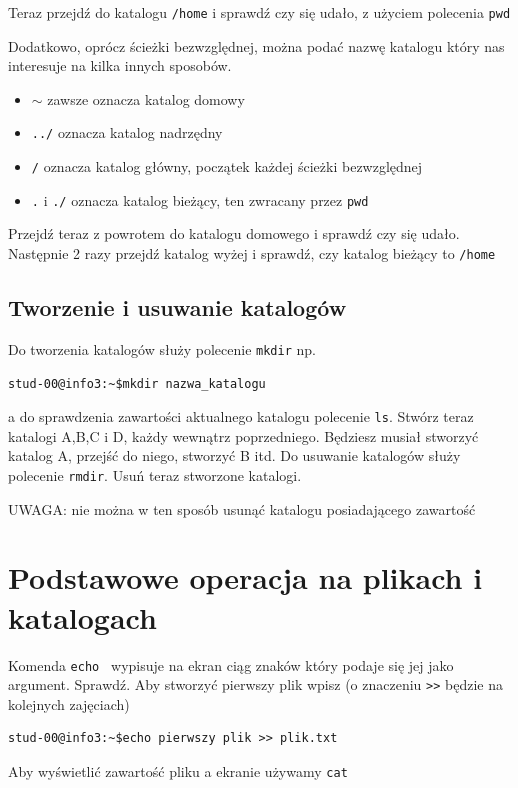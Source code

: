 \documentclass[landscape]{article}
\begin{document}
Teraz przejdź do katalogu {\tt /home} i sprawdź czy się udało, z użyciem polecenia {\tt pwd}

Dodatkowo, oprócz ścieżki bezwzględnej, można podać nazwę katalogu który nas interesuje na kilka innych sposobów.

\begin{itemize}
\item $\sim$  zawsze oznacza katalog domowy
\item {\tt ../} oznacza katalog nadrzędny
\item {\tt /} oznacza katalog główny, początek każdej ścieżki bezwzględnej
\item {\tt .} i {\tt ./} oznacza katalog bieżący, ten zwracany przez {\tt pwd}
\end{itemize}

Przejdź teraz z powrotem do katalogu domowego i sprawdź czy się udało. Następnie 2 razy przejdź katalog wyżej i sprawdź, czy katalog bieżący to {\tt /home}

\subsection{Tworzenie i usuwanie katalogów}

Do tworzenia katalogów służy polecenie {\tt mkdir} np.
\begin{verbatim}
stud-00@info3:~$mkdir nazwa_katalogu
\end{verbatim}

a do sprawdzenia zawartości aktualnego katalogu polecenie {\tt ls}. Stwórz teraz katalogi A,B,C i D, każdy wewnątrz poprzedniego. Będziesz musiał stworzyć katalog A, przejść do niego, stworzyć B itd.
Do usuwanie katalogów służy polecenie {\tt rmdir}. Usuń teraz stworzone katalogi.

UWAGA: nie można w ten sposób usunąć katalogu posiadającego zawartość

\section{Podstawowe operacja na plikach i katalogach}
Komenda {\tt echo } wypisuje na ekran ciąg znaków który podaje się jej jako argument. Sprawdź.
Aby stworzyć pierwszy plik wpisz (o znaczeniu {\tt >>} będzie na kolejnych zajęciach)
\begin{verbatim}
stud-00@info3:~$echo pierwszy plik >> plik.txt
\end{verbatim}

Aby wyświetlić zawartość pliku a ekranie używamy {\tt cat}
\end{document}
